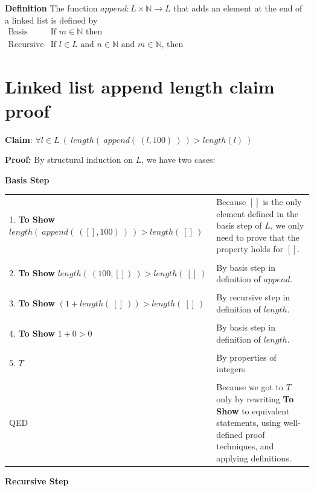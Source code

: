 \documentclass[12pt, oneside]{article}
\begin{document}
{\bf Definition} The function $append : L \times \mathbb{N} \to L$ that 
adds an element at the end of a linked list is defined by
\[
\begin{array}{llll}
\textrm{Basis Step:} & \textrm{If } m \in \mathbb{N}\textrm{ then } & \phantom{append(~([], m)~)} & \phantom{= (m, []) }\\
\textrm{Recursive Step:} & \textrm{If } l \in L\textrm{ and }n \in \mathbb{N}\textrm{ and }m \in \mathbb{N}\textrm{, then  } & \phantom{append(~(~(n, l), m~)~) } &\phantom{= (n, append(~(l, m)~)~)}
\end{array}
\] \vfill
\section*{Linked list append length claim proof}


{\bf Claim}: $\forall l \in L ~ (~length(~append(~(l, 100)~)~) > length(l)~)$

{\bf Proof:} By structural induction on $L$, we have two cases:

{\bf Basis Step}

    \begin{tabular}{l p{3.5in}}
     1. \textbf{To Show} $length(~append(~([], 100)~)~) > length(~[]~)$
    & Because $[]$ is the only element defined in the basis step of $L$, 
    we only need to prove that the property holds for $[]$.\\
    &  \\
     2. \textbf{To Show} $length(~(100,[])~) > length(~[]~)$
    &  By basis step in definition of $append$.\\
    &  \\
     3. \textbf{To Show} $(1 +length(~[]~)) > length(~[]~)$
    &  By recursive step in definition of $length$.\\
    &  \\    
     4. \textbf{To Show} $1+0 > 0$
    &  By basis step in definition of $length$.\\
    &  \\    
    5. $T$
    & By properties of integers \\
    &  \\    
    QED & Because we got to $T$ only by rewriting \textbf{To Show} to equivalent statements, using well-defined proof techniques, and applying definitions. \\
    \end{tabular}

{\bf Recursive Step}
\end{document}
